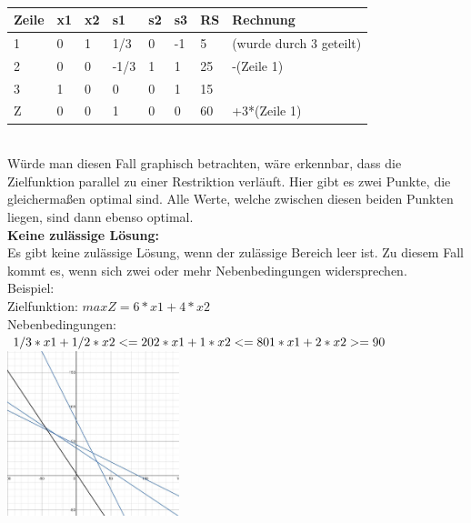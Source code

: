 \\
\begin{table}[!ht]
\begin{tabular}{|l|l|l|l|l|l|l|l|}
\hline
\rowcolor[HTML]{C0C0C0} 
Zeile                     & x1 & x2 & s1   & s2 & s3 & RS & Rechnung                \\ \hline
\rowcolor[HTML]{FFFFFF} 
\cellcolor[HTML]{C0C0C0}1 & 0  & 1  & 1/3  & 0  & -1 & 5  & (wurde durch 3 geteilt) \\ \hline
\rowcolor[HTML]{FFFFFF} 
\cellcolor[HTML]{C0C0C0}2 & 0  & 0  & -1/3 & 1  & 1  & 25 & -(Zeile 1)              \\ \hline
\rowcolor[HTML]{FFFFFF} 
\cellcolor[HTML]{C0C0C0}3 & 1  & 0  & 0    & 0  & 1  & 15 &                         \\ \hline
\rowcolor[HTML]{FFFFFF} 
\cellcolor[HTML]{C0C0C0}Z & 0  & 0  & 1    & 0  & 0  & 60 & +3*(Zeile 1)            \\ \hline
\end{tabular}
\end{table}
\\
Würde man diesen Fall graphisch betrachten, wäre erkennbar, dass die Zielfunktion parallel zu einer Restriktion verläuft. Hier gibt es zwei Punkte, die gleichermaßen optimal sind. Alle Werte, welche zwischen diesen beiden Punkten liegen, sind dann ebenso optimal.\\
\textbf{Keine zulässige Lösung: }\\
Es gibt keine zulässige Lösung, wenn der zulässige Bereich leer ist. Zu diesem Fall kommt es, wenn sich zwei oder mehr Nebenbedingungen widersprechen.\\
Beispiel:\\
Zielfunktion: \begin{math}max Z = 6*x1+4*x2\end{math}\\
Nebenbedingungen:\\
\begin{math}
1/3*x1+1/2*x2 <= 20\\
2*x1+1*x2 <= 80\\
1*x1+2*x2 >= 90\\
\end{math}
\includegraphics[width = 5cm, right]{images/IMG_keine_Losung.jpeg}
